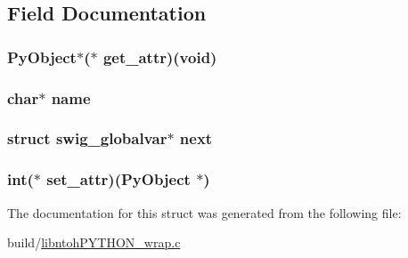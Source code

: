 \subsection{Field Documentation}
\hypertarget{structswig__globalvar_a0879d4d584d1ffda2ef5f917dc5a6f0a}{
\subsubsection[{get\-\_\-attr}]{\setlength{\rightskip}{0pt plus 5cm}Py\-Object$\ast$($\ast$ get\-\_\-attr)(void)}}\label{structswig__globalvar_a0879d4d584d1ffda2ef5f917dc5a6f0a}
\hypertarget{structswig__globalvar_a5ac083a645d964373f022d03df4849c8}{
\subsubsection[{name}]{\setlength{\rightskip}{0pt plus 5cm}char$\ast$ name}}\label{structswig__globalvar_a5ac083a645d964373f022d03df4849c8}
\hypertarget{structswig__globalvar_acaa8d5ee0bdeaf2c6975b8751dc580fa}{
\subsubsection[{next}]{\setlength{\rightskip}{0pt plus 5cm}struct {\bf swig\-\_\-globalvar}$\ast$ next}}\label{structswig__globalvar_acaa8d5ee0bdeaf2c6975b8751dc580fa}
\hypertarget{structswig__globalvar_aa452f906a54c91621799831e4280478f}{
\subsubsection[{set\-\_\-attr}]{\setlength{\rightskip}{0pt plus 5cm}int($\ast$ set\-\_\-attr)(Py\-Object $\ast$)}}\label{structswig__globalvar_aa452f906a54c91621799831e4280478f}


The documentation for this struct was generated from the following file\-:\begin{DoxyCompactItemize}
\item 
build/\hyperlink{libntoh_p_y_t_h_o_n__wrap_8c}{libntoh\-P\-Y\-T\-H\-O\-N\-\_\-wrap.\-c}\end{DoxyCompactItemize}
